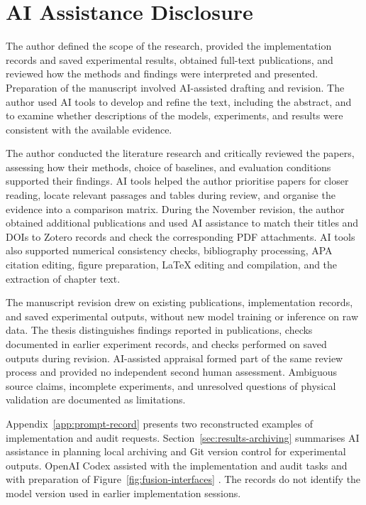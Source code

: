 \clearpage
\begingroup
\makeatletter
\renewcommand{\@makeschapterhead}[1]{%
  {\parindent=0pt\raggedright\normalfont\Huge\bfseries #1\par}%
  \nobreak\vspace{6pt}}
\makeatother
\chapter*{AI Assistance Disclosure}
\endgroup
\noindent
The author defined the scope of the research, provided the implementation records and saved experimental results, obtained full-text publications, and reviewed how the methods and findings were interpreted and presented. Preparation of the manuscript involved AI-assisted drafting and revision. The author used AI tools to develop and refine the text, including the abstract, and to examine whether descriptions of the models, experiments, and results were consistent with the available evidence.

The author conducted the literature research and critically reviewed the papers, assessing how their methods, choice of baselines, and evaluation conditions supported their findings. AI tools helped the author prioritise papers for closer reading, locate relevant passages and tables during review, and organise the evidence into a comparison matrix. During the November revision, the author obtained additional publications and used AI assistance to match their titles and DOIs to Zotero records and check the corresponding PDF attachments. AI tools also supported numerical consistency checks, bibliography processing, APA citation editing, figure preparation, LaTeX editing and compilation, and the extraction of chapter text.

The manuscript revision drew on existing publications, implementation records, and saved experimental outputs, without new model training or inference on raw data. The thesis distinguishes findings reported in publications, checks documented in earlier experiment records, and checks performed on saved outputs during revision. AI-assisted appraisal formed part of the same review process and provided no independent second human assessment. Ambiguous source claims, incomplete experiments, and unresolved questions of physical validation are documented as limitations.

Appendix~\ref{app:prompt-record} presents two reconstructed examples of implementation and audit requests. Section~\ref{sec:results-archiving} summarises AI assistance in planning local archiving and Git version control for experimental outputs. OpenAI Codex assisted with the implementation and audit tasks and with preparation of Figure~\ref{fig:fusion-interfaces} \citep{OpenAICodex}. The records do not identify the model version used in earlier implementation sessions.
